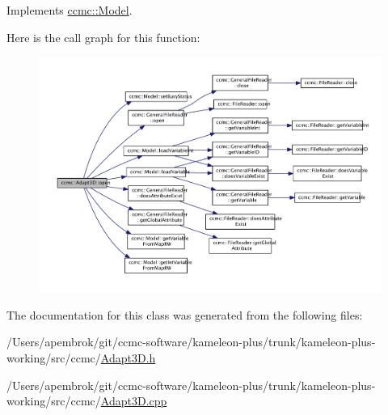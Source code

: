 Implements \hyperlink{classccmc_1_1_model_a3c64dc635c2c1a2fe2f8efa2a3666282}{ccmc\-::\-Model}.



Here is the call graph for this function\-:\nopagebreak
\begin{figure}[H]
\begin{center}
\leavevmode
\includegraphics[width=350pt]{classccmc_1_1_adapt3_d_a02a5f2b5ba26cacd93f7c41c68c4b24a_cgraph}
\end{center}
\end{figure}




The documentation for this class was generated from the following files\-:\begin{DoxyCompactItemize}
\item 
/\-Users/apembrok/git/ccmc-\/software/kameleon-\/plus/trunk/kameleon-\/plus-\/working/src/ccmc/\hyperlink{_adapt3_d_8h}{Adapt3\-D.\-h}\item 
/\-Users/apembrok/git/ccmc-\/software/kameleon-\/plus/trunk/kameleon-\/plus-\/working/src/ccmc/\hyperlink{_adapt3_d_8cpp}{Adapt3\-D.\-cpp}\end{DoxyCompactItemize}
